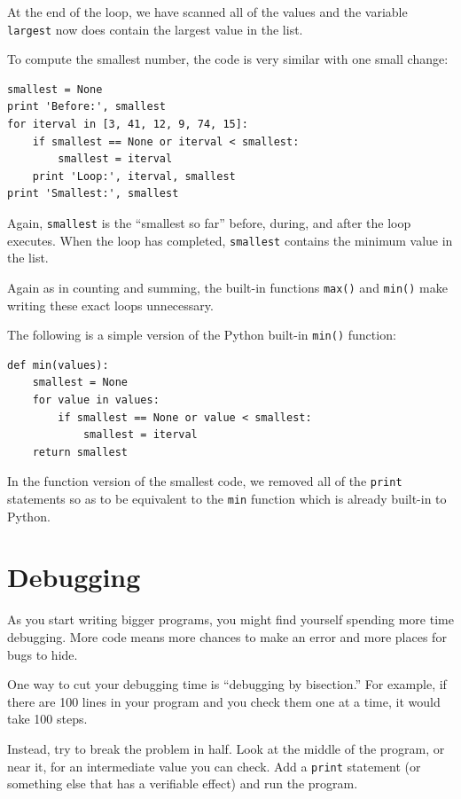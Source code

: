 \documentclass[10pt]{book}
\begin{document}
At the end of the loop, we have scanned all of the values and
the variable {\tt largest} now does contain the largest value
in the list.

To compute the smallest number, the code is very similar with one
small change:

\beforeverb
\begin{verbatim}
smallest = None
print 'Before:', smallest
for iterval in [3, 41, 12, 9, 74, 15]:
    if smallest == None or iterval < smallest:
        smallest = iterval
    print 'Loop:', iterval, smallest
print 'Smallest:', smallest
\end{verbatim}
\afterverb
%
Again, {\tt smallest} is the ``smallest so far'' before, during, and after the 
loop executes.  When the loop has completed, {\tt smallest} contains the
minimum value in the list.

Again as in counting and summing, the built-in functions 
{\tt max()} and {\tt min()} make writing these exact loops
unnecessary.

The following is a simple version of the Python built-in
{\tt min()} function:

\beforeverb
\begin{verbatim}
def min(values):
    smallest = None
    for value in values:
        if smallest == None or value < smallest:
            smallest = iterval
    return smallest
\end{verbatim}
\afterverb
%
In the function version of the smallest code, we removed all of the 
{\tt print} statements so as to be equivalent to the {\tt min} 
function which is already built-in to Python.

\section{Debugging}

As you start writing bigger programs, you might find yourself
spending more time debugging.  More code means more chances to
make an error and more places for bugs to hide.


One way to cut your debugging time is ``debugging by bisection.''
For example, if there are 100 lines in your program and you
check them one at a time, it would take 100 steps.

Instead, try to break the problem in half.  Look at the middle
of the program, or near it, for an intermediate value you
can check.  Add a {\tt print} statement (or something else
that has a verifiable effect) and run the program.
\end{document}
